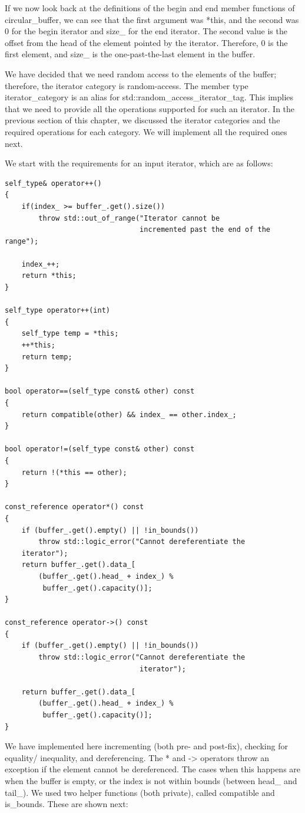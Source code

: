 If we now look back at the definitions of the begin and end member functions of circular\_buffer, we can see that the first argument was *this, and the second was 0 for the begin iterator and size\_ for the end iterator. The second value is the offset from the head of the element pointed by the iterator. Therefore, 0 is the first element, and size\_ is the one-past-the-last element in the buffer.

We have decided that we need random access to the elements of the buffer; therefore, the iterator category is random-access. The member type iterator\_category is an alias for std::random\_access\_iterator\_tag. This implies that we need to provide all the operations supported for such an iterator. In the previous section of this chapter, we discussed the iterator categories and the required operations for each category. We will implement all the required ones next.

We start with the requirements for an input iterator, which are as follows:

\begin{lstlisting}[style=styleCXX]
self_type& operator++()
{
	if(index_ >= buffer_.get().size())
		throw std::out_of_range("Iterator cannot be
								incremented past the end of the range");
								
	index_++;
	return *this;
}

self_type operator++(int)
{
	self_type temp = *this;
	++*this;
	return temp;
}

bool operator==(self_type const& other) const
{
	return compatible(other) && index_ == other.index_;
}

bool operator!=(self_type const& other) const
{
	return !(*this == other);
}

const_reference operator*() const
{
	if (buffer_.get().empty() || !in_bounds())
		throw std::logic_error("Cannot dereferentiate the
	iterator");
	return buffer_.get().data_[
		(buffer_.get().head_ + index_) %
		 buffer_.get().capacity()];
}

const_reference operator->() const
{
	if (buffer_.get().empty() || !in_bounds())
		throw std::logic_error("Cannot dereferentiate the
								iterator");
								
	return buffer_.get().data_[
		(buffer_.get().head_ + index_) %
		 buffer_.get().capacity()];
}
\end{lstlisting}

We have implemented here incrementing (both pre- and post-fix), checking for equality/ inequality, and dereferencing. The * and -> operators throw an exception if the element cannot be dereferenced. The cases when this happens are when the buffer is empty, or the index is not within bounds (between head\_ and tail\_). We used two helper functions (both private), called compatible and is\_bounds. These are shown next:


